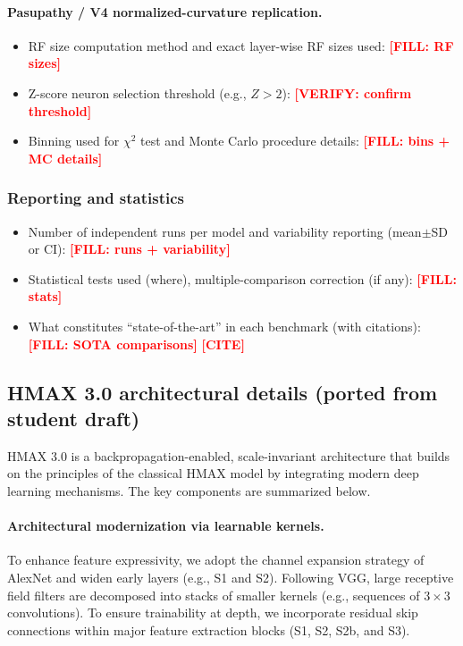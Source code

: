 \documentclass[pdflatex,sn-nature]{sn-jnl}
\newcommand{\FILL}[1]{\textcolor{red}{\textbf{[FILL: #1]}}}
\newcommand{\CITEHERE}{\textcolor{red}{\textbf{[CITE]}}}
\newcommand{\VERIFY}[1]{\textcolor{red}{\textbf{[VERIFY: #1]}}}
\begin{document}
\paragraph{Pasupathy / V4 normalized-curvature replication.}
\begin{itemize}
    \item RF size computation method and exact layer-wise RF sizes used: \FILL{RF sizes}
    \item Z-score neuron selection threshold (e.g., $Z>2$): \VERIFY{confirm threshold}
    \item Binning used for $\chi^2$ test and Monte Carlo procedure details: \FILL{bins + MC details}
\end{itemize}

\subsubsection*{Reporting and statistics}
\begin{itemize}
    \item Number of independent runs per model and variability reporting (mean$\pm$SD or CI): \FILL{runs + variability}
    \item Statistical tests used (where), multiple-comparison correction (if any): \FILL{stats}
    \item What constitutes ``state-of-the-art'' in each benchmark (with citations): \FILL{SOTA comparisons} \quad \CITEHERE
\end{itemize}


\subsection{HMAX 3.0 architectural details (ported from student draft)}

HMAX 3.0 is a backpropagation-enabled, scale-invariant architecture that builds on the principles
of the classical HMAX model by integrating modern deep learning mechanisms. The key components are
summarized below.

\paragraph{Architectural modernization via learnable kernels.}
To enhance feature expressivity, we adopt the channel expansion strategy of AlexNet and widen early
layers (e.g., S1 and S2). Following VGG, large receptive field filters are decomposed into stacks of
smaller kernels (e.g., sequences of $3\times 3$ convolutions). To ensure trainability at depth, we
incorporate residual skip connections within major feature extraction blocks (S1, S2, S2b, and S3).
\end{document}
